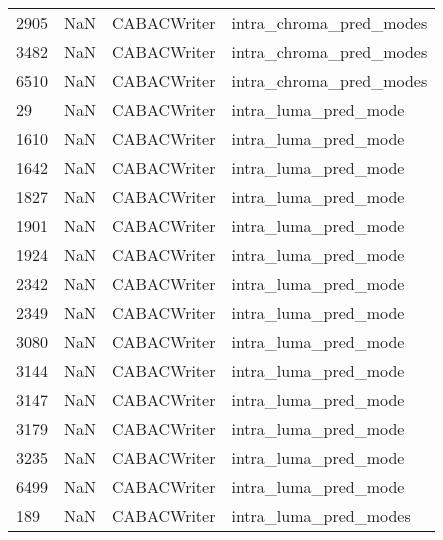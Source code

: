\begin{tabular}{llll}
2905 &                   NaN &                CABACWriter &                   intra\_chroma\_pred\_modes \\
3482 &                   NaN &                CABACWriter &                   intra\_chroma\_pred\_modes \\
6510 &                   NaN &                CABACWriter &                   intra\_chroma\_pred\_modes \\
29   &                   NaN &                CABACWriter &                      intra\_luma\_pred\_mode \\
1610 &                   NaN &                CABACWriter &                      intra\_luma\_pred\_mode \\
1642 &                   NaN &                CABACWriter &                      intra\_luma\_pred\_mode \\
1827 &                   NaN &                CABACWriter &                      intra\_luma\_pred\_mode \\
1901 &                   NaN &                CABACWriter &                      intra\_luma\_pred\_mode \\
1924 &                   NaN &                CABACWriter &                      intra\_luma\_pred\_mode \\
2342 &                   NaN &                CABACWriter &                      intra\_luma\_pred\_mode \\
2349 &                   NaN &                CABACWriter &                      intra\_luma\_pred\_mode \\
3080 &                   NaN &                CABACWriter &                      intra\_luma\_pred\_mode \\
3144 &                   NaN &                CABACWriter &                      intra\_luma\_pred\_mode \\
3147 &                   NaN &                CABACWriter &                      intra\_luma\_pred\_mode \\
3179 &                   NaN &                CABACWriter &                      intra\_luma\_pred\_mode \\
3235 &                   NaN &                CABACWriter &                      intra\_luma\_pred\_mode \\
6499 &                   NaN &                CABACWriter &                      intra\_luma\_pred\_mode \\
189  &                   NaN &                CABACWriter &                     intra\_luma\_pred\_modes \\

\end{tabular}
